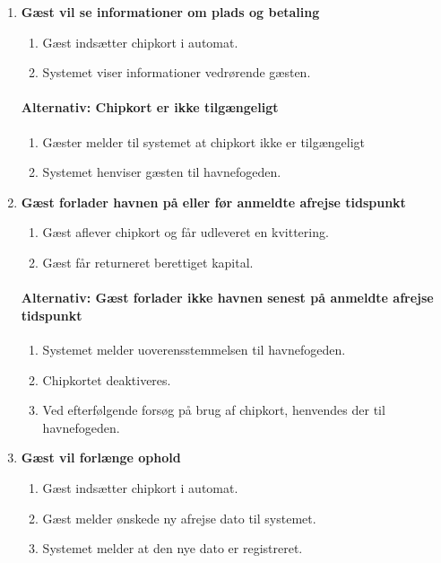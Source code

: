 \begin{enumerate}
    \item{\bf{Gæst vil se informationer om plads og betaling}}
      \begin{enumerate}
        \item Gæst indsætter chipkort i automat.
        \item Systemet viser informationer vedrørende gæsten.
      \end{enumerate}

    \paragraph{Alternativ: Chipkort er ikke tilgængeligt}
      \begin{enumerate}
        \item Gæster melder til systemet at chipkort ikke er tilgængeligt
        \item Systemet henviser gæsten til havnefogeden.
      \end{enumerate}


    \item{\bf{Gæst forlader havnen på eller før anmeldte afrejse tidspunkt}}
      \begin{enumerate}
        \item Gæst aflever chipkort og får udleveret en kvittering.
        \item Gæst får returneret berettiget kapital.
      \end{enumerate}

    \paragraph{Alternativ: Gæst forlader ikke havnen senest på anmeldte afrejse tidspunkt}
      \begin{enumerate}
        \item Systemet melder uoverensstemmelsen til havnefogeden.
        \item Chipkortet deaktiveres.
        \item Ved efterfølgende forsøg på brug af chipkort, henvendes der til havnefogeden.
      \end{enumerate}


    \item{\bf{Gæst vil forlænge ophold}}
      \begin{enumerate}
        \item Gæst indsætter chipkort i automat.
        \item Gæst melder ønskede ny afrejse dato til systemet.
        \item Systemet melder at den nye dato er registreret.
      \end{enumerate}


\end{enumerate}
